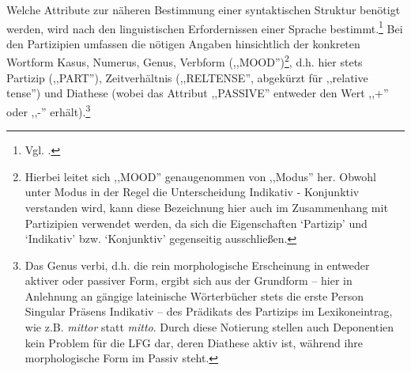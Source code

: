 \documentclass[12pt,a4paper]{article}
\begin{document}
Welche Attribute zur näheren Bestimmung einer syntaktischen Struktur benötigt werden, wird nach den linguistischen Erfordernissen einer Sprache bestimmt.\footnote{Vgl. \cite[8]{Skript}.} Bei den Partizipien umfassen die nötigen Angaben hinsichtlich der konkreten Wortform Kasus, Numerus, Genus, Verbform (,,MOOD'')\footnote{Hierbei leitet sich ,,MOOD'' genaugenommen von ,,Modus'' her. Obwohl unter Modus in der Regel die Unterscheidung Indikativ - Konjunktiv verstanden wird, kann diese Bezeichnung hier 	auch im Zusammenhang mit Partizipien verwendet werden, da sich die Eigenschaften `Partizip' und `Indikativ' bzw. `Konjunktiv' gegenseitig ausschließen.}, d.h. hier stets Partizip (,,PART''), Zeitverhältnis (,,RELTENSE'', abgekürzt für ,,relative tense'') und Diathese (wobei das Attribut ,,PASSIVE'' entweder den Wert ,,+'' oder ,,-'' erhält).\footnote{Das Genus verbi, d.h. die rein morphologische Erscheinung in entweder aktiver oder passiver Form, ergibt sich aus der Grundform -- hier in Anlehnung an gängige lateinische Wörterbücher stets die erste Person Singular Präsens Indikativ -- des Prädikats des Partizips im Lexikoneintrag, wie z.B. \textit{mittor} statt \textit{mitto}. Durch diese Notierung stellen auch Deponentien kein Problem für die LFG dar, deren Diathese aktiv ist, während ihre morphologische Form im Passiv steht.}

\end{document}
